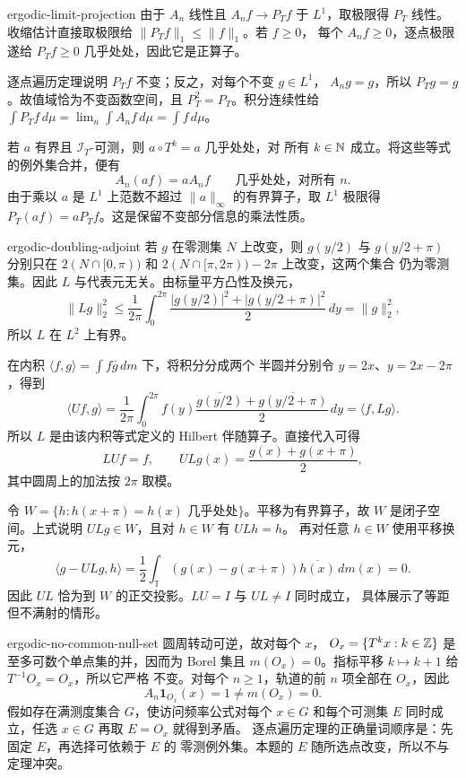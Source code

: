 \begin{solution}{ergodic-limit-projection}
由于 $A_n$ 线性且 $A_nf\to P_Tf$ 于 $L^1$，取极限得 $P_T$ 线性。
收缩估计直接取极限给 $\|P_Tf\|_1\le\|f\|_1$。若 $f\ge0$，
每个 $A_nf\ge0$，逐点极限遂给 $P_Tf\ge0$ 几乎处处，因此它是正算子。

逐点遍历定理说明 $P_Tf$ 不变；反之，对每个不变 $g\in L^1$，
$A_ng=g$，所以 $P_Tg=g$。故值域恰为不变函数空间，且
$P_T^2=P_T$。积分连续性给
$\int P_Tf\,d\mu=\lim_n\int A_nf\,d\mu=\int f\,d\mu$。

若 $a$ 有界且 $\mathcal I_T$-可测，则 $a\circ T^k=a$ 几乎处处，对
所有 $k\in\mathbb{N}$ 成立。将这些等式的例外集合并，便有
\[
 A_n(af)=aA_nf\qquad\text{几乎处处，对所有 }n.
\]
由于乘以 $a$ 是 $L^1$ 上范数不超过 $\|a\|_\infty$ 的有界算子，取
$L^1$ 极限得 $P_T(af)=aP_Tf$。这是保留不变部分信息的乘法性质。
\end{solution}

\begin{solution}{ergodic-doubling-adjoint}
若 $g$ 在零测集 $N$ 上改变，则 $g(y/2)$ 与 $g(y/2+\pi)$ 分别只在
$2(N\cap[0,\pi))$ 和 $2(N\cap[\pi,2\pi))-2\pi$ 上改变，这两个集合
仍为零测集。因此 $L$ 与代表元无关。由标量平方凸性及换元，
\[
 \|Lg\|_2^2
 \le\frac1{2\pi}\int_0^{2\pi}
      \frac{|g(y/2)|^2+|g(y/2+\pi)|^2}{2}\,dy
 =\|g\|_2^2,
\]
所以 $L$ 在 $L^2$ 上有界。

在内积 $\langle f,g\rangle=\int f\overline g\,dm$ 下，将积分分成两个
半圆并分别令 $y=2x$、$y=2x-2\pi$，得到
\[
 \langle Uf,g\rangle
 =\frac1{2\pi}\int_0^{2\pi}f(y)
       \frac{\overline{g(y/2)}+\overline{g(y/2+\pi)}}2\,dy
 =\langle f,Lg\rangle.
\]
所以 $L$ 是由该内积等式定义的 Hilbert 伴随算子。直接代入可得
\[
 LUf=f,\qquad
 ULg(x)=\frac{g(x)+g(x+\pi)}2,
\]
其中圆周上的加法按 $2\pi$ 取模。

令 $W=\{h:h(x+\pi)=h(x)\text{ 几乎处处}\}$。平移为有界算子，故 $W$
是闭子空间。上式说明 $ULg\in W$，且对 $h\in W$ 有 $ULh=h$。
再对任意 $h\in W$ 使用平移换元，
\[
 \langle g-ULg,h\rangle
 =\frac12\int_{\mathbb T}(g(x)-g(x+\pi))\overline{h(x)}\,dm(x)=0.
\]
因此 $UL$ 恰为到 $W$ 的正交投影。$LU=I$ 与 $UL\ne I$ 同时成立，
具体展示了等距但不满射的情形。
\end{solution}

\begin{solution}{ergodic-no-common-null-set}
圆周转动可逆，故对每个 $x$，
$O_x=\{T^kx:k\in\mathbb{Z}\}$ 是至多可数个单点集的并，因而为 Borel 集且
$m(O_x)=0$。指标平移 $k\mapsto k+1$ 给 $T^{-1}O_x=O_x$，所以它严格
不变。对每个 $n\ge1$，轨道的前 $n$ 项全部在 $O_x$，因此
\[
 A_n\mathbf1_{O_x}(x)=1\ne m(O_x)=0.
\]
假如存在满测度集合 $G$，使访问频率公式对每个 $x\in G$ 和每个可测集
$E$ 同时成立，任选 $x\in G$ 再取 $E=O_x$ 就得到矛盾。
逐点遍历定理的正确量词顺序是：先固定 $E$，再选择可依赖于 $E$ 的
零测例外集。本题的 $E$ 随所选点改变，所以不与定理冲突。
\end{solution}

